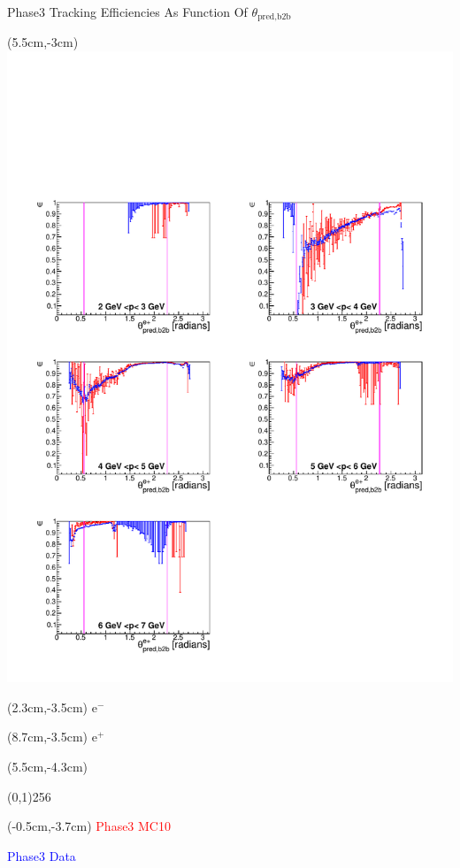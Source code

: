 \documentclass[8pt]{beamer}
\begin{document}
\begin{frame}{Phase3 Tracking Efficiencies As Function Of $\theta_{\textrm{pred,b2b}}$}
	\begin{textblock*}{6.5cm}(5.5cm,-3cm)
		\includegraphics[width=\textwidth]{VPlots/P3/xPMThetaepP3}
	\end{textblock*}
	
	
	\begin{textblock*}{2cm}(2.3cm,-3.5cm)
		$\textrm{e}^-$
	\end{textblock*}
	
	\begin{textblock*}{2cm}(8.7cm,-3.5cm)
		$\textrm{e}^+$
	\end{textblock*}
	
	
	
	\begin{textblock*}{11cm}(5.5cm,-4.3cm)
		
		\begin{center}
			\line(0,1){256}
		\end{center}
		
	\end{textblock*}
	
	\begin{textblock*}{4cm}(-0.5cm,-3.7cm)
		\textcolor{red}{Phase3 MC10}
		
		\textcolor{blue}{Phase3 Data}
	\end{textblock*}
	
	
	
	
\end{frame}
\end{document}
